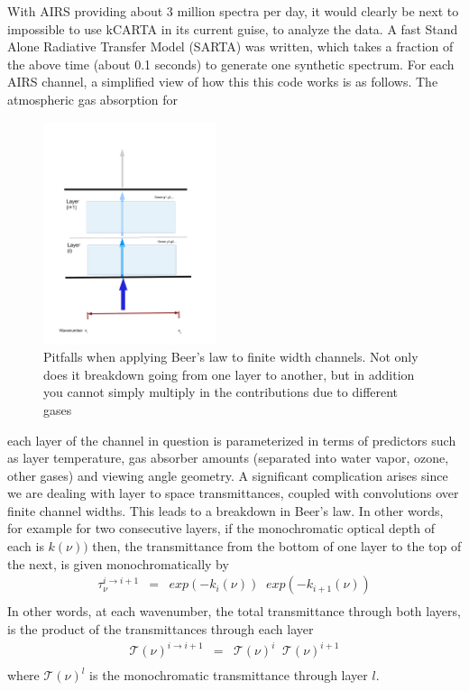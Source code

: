 \documentclass[11pt]{article}
\newcommand{\kc}{\textsf{kCARTA}\xspace}
\begin{document}
With AIRS providing about 3 million spectra per day, it would clearly be next to impossible to use \kc 
in its current guise, to analyze the data. A fast Stand Alone Radiative Transfer Model (SARTA) was written,
which 
takes a fraction of the above time (about 0.1 seconds) to generate one synthetic spectrum. For each AIRS
channel, a simplified view of how this this code works is as follows. The atmospheric gas absorption for  
\begin{figure}
\centering
\includegraphics[width=0.45\textwidth]{Figs/twolayers.pdf}
\caption{
Pitfalls when applying Beer's law to finite width channels. Not only does it breakdown going from one layer to 
another, but in addition you cannot simply multiply in the contributions due to different gases
}
\end{figure}
each layer of the channel in question is parameterized in terms of predictors such as layer temperature, 
gas absorber amounts (separated into water vapor, ozone, other gases) and viewing angle geometry. A significant
complication arises since we are dealing with layer to space transmittances, coupled with convolutions over
finite channel widths. This leads to a breakdown in Beer's law. In other words, for example for two 
consecutive layers, if the monochromatic optical depth of each is $k(\nu))$ then, the transmittance from the 
bottom of one layer to the top of the next, is given monochromatically by
\begin{eqnarray*}
  \tau_{\nu}^{i \rightarrow i+1} & = & exp(-k_{i}(\nu)) \;\; exp(-k_{i+1}(\nu)) \\
\end{eqnarray*}
In other words, at each wavenumber, the total transmittance through both layers, is the product of the 
transmittances through each layer
\begin{eqnarray*}
  \mathcal{T}(\nu)^{i \rightarrow i+1}           & = &  \mathcal{T}(\nu)^{i} \;\;  \mathcal{T}(\nu)^{i+1}\\
\end{eqnarray*}
where $\mathcal{T}(\nu)^{l}$ is the monochromatic transmittance through layer $l$. 
\end{document}
